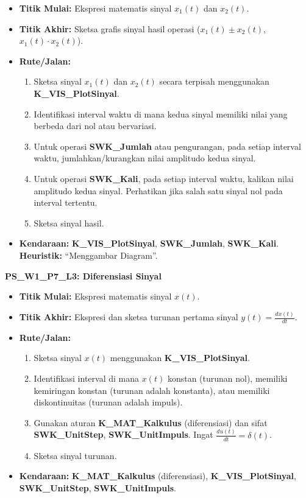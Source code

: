 \documentclass[
  letterpaper,
  DIV=11,
  numbers=noendperiod]{scrreprt}
\providecommand{\tightlist}{%
  \setlength{\itemsep}{0pt}\setlength{\parskip}{0pt}}\usepackage{longtable,booktabs,array}
\begin{document}
\begin{itemize}
\tightlist
\item
  \textbf{Titik Mulai:} Ekspresi matematis sinyal \(x_1(t)\) dan
  \(x_2(t)\).
\item
  \textbf{Titik Akhir:} Sketsa grafis sinyal hasil operasi
  (\(x_1(t) \pm x_2(t)\), \(x_1(t) \cdot x_2(t)\)).
\item
  \textbf{Rute/Jalan:}

  \begin{enumerate}
  \def\labelenumi{\arabic{enumi}.}
  \tightlist
  \item
    Sketsa sinyal \(x_1(t)\) dan \(x_2(t)\) secara terpisah menggunakan
    \textbf{K\_VIS\_PlotSinyal}.
  \item
    Identifikasi interval waktu di mana kedua sinyal memiliki nilai yang
    berbeda dari nol atau bervariasi.
  \item
    Untuk operasi \textbf{SWK\_Jumlah} atau pengurangan, pada setiap
    interval waktu, jumlahkan/kurangkan nilai amplitudo kedua sinyal.
  \item
    Untuk operasi \textbf{SWK\_Kali}, pada setiap interval waktu,
    kalikan nilai amplitudo kedua sinyal. Perhatikan jika salah satu
    sinyal nol pada interval tertentu.
  \item
    Sketsa sinyal hasil.
  \end{enumerate}
\item
  \textbf{Kendaraan:} \textbf{K\_VIS\_PlotSinyal}, \textbf{SWK\_Jumlah},
  \textbf{SWK\_Kali}. \textbf{Heuristik:} ``Menggambar Diagram''.
\end{itemize}

\textbf{PS\_W1\_P7\_L3: Diferensiasi Sinyal}

\begin{itemize}
\tightlist
\item
  \textbf{Titik Mulai:} Ekspresi matematis sinyal \(x(t)\).
\item
  \textbf{Titik Akhir:} Ekspresi dan sketsa turunan pertama sinyal
  \(y(t) = \frac{dx(t)}{dt}\).
\item
  \textbf{Rute/Jalan:}

  \begin{enumerate}
  \def\labelenumi{\arabic{enumi}.}
  \tightlist
  \item
    Sketsa sinyal \(x(t)\) menggunakan \textbf{K\_VIS\_PlotSinyal}.
  \item
    Identifikasi interval di mana \(x(t)\) konstan (turunan nol),
    memiliki kemiringan konstan (turunan adalah konstanta), atau
    memiliki diskontinuitas (turunan adalah impuls).
  \item
    Gunakan aturan \textbf{K\_MAT\_Kalkulus} (diferensiasi) dan sifat
    \textbf{SWK\_UnitStep}, \textbf{SWK\_UnitImpuls}. Ingat
    \(\frac{du(t)}{dt} = \delta(t)\).
  \item
    Sketsa sinyal turunan.
  \end{enumerate}
\item
  \textbf{Kendaraan:} \textbf{K\_MAT\_Kalkulus} (diferensiasi),
  \textbf{K\_VIS\_PlotSinyal}, \textbf{SWK\_UnitStep},
  \textbf{SWK\_UnitImpuls}.
\end{itemize}
\end{document}
